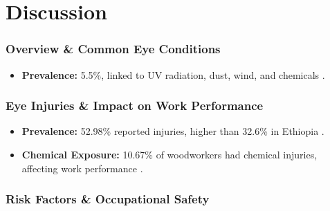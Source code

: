 \section{Discussion}
\begin{frame}
\frametitle{Overview \& Common Eye Conditions}
    \begin{itemize}
        \item \textbf{Prevalence:} 5.5\%, linked to UV radiation, dust, wind, and chemicals \parencite{modenese2018occupational}.
    \end{itemize}
\end{frame}

\begin{frame}
    \frametitle{Eye Injuries \& Impact on Work Performance}
    \begin{itemize}
        \item \textbf{Prevalence:} 52.98\% reported injuries, higher than 32.6\% in Ethiopia \parencite{gebremeskel2019prevalence}.
        \item \textbf{Chemical Exposure:} 10.67\% of woodworkers had chemical injuries, affecting work performance \parencite{iyiade2012pattern}.
    \end{itemize}
\end{frame}
    
\begin{frame}
    \frametitle{Risk Factors \& Occupational Safety}
    
\end{frame}
        